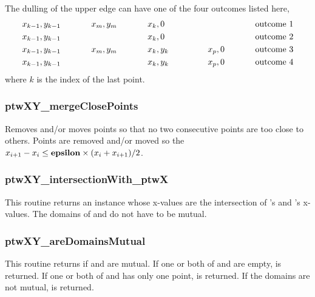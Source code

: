 The dulling of the upper edge can have one of the four outcomes listed here,
\begin{eqnarray}
    x_{k-1}, y_{k-1} \hskip .5 in x_m, y_m \hskip .5 in            & x_k, 0 & \hskip .5 in  \hphantom{x_p, 0} \hskip .5 in {\rm outcome \ 1} \nonumber \\
    x_{k-1}, y_{k-1} \hskip .5 in \hphantom{x_m, y_m} \hskip .5 in & x_k, 0 & \hskip .5 in  \hphantom{x_p, 0} \hskip .5 in {\rm outcome \ 2} \nonumber \\
    x_{k-1}, y_{k-1} \hskip .5 in x_m, y_m \hskip .5 in            & x_k, y_k & \hskip .5 in x_p, 0 \hskip .5 in {\rm outcome \ 3} \nonumber \\
    x_{k-1}, y_{k-1} \hskip .5 in \hphantom{x_m, y_m} \hskip .5 in & x_k, y_k & \hskip .5 in x_p, 0 \hskip .5 in {\rm outcome \ 4} \nonumber
\end{eqnarray}
where $k$ is the index of the last point.

\subsubsection{ptwXY\_mergeClosePoints}
Removes and/or moves points so that no two consecutive points are too close to others.
Points are removed and/or moved so the $x_{i+1} - x_i \le {\bf epsilon} \times ( x_i + x_{i+1} ) / 2$.

\subsubsection{ptwXY\_intersectionWith\_ptwX}
This routine returns an  instance whose x-values are the intersection of 's and
's x-values. The domains of  and  do not have to be mutual.

\subsubsection{ptwXY\_areDomainsMutual}
This routine returns  if  and  are mutual.
If one or both of  and  are empty,  is returned.
If one or both of  and  has only one point,  is returned.
If the domains are not mutual,  is returned.

